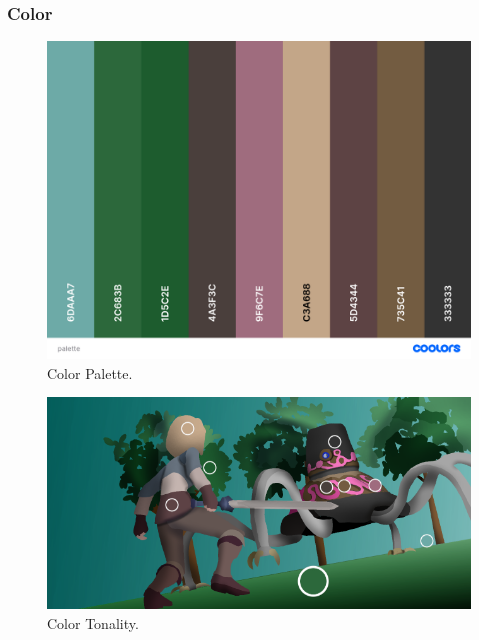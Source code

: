\documentclass{cup-pan}
\begin{document}
        \subsubsection{Color}

            \begin{figure}[H]
                \includegraphics[width=\textwidth]{Imagenes/Fanart2/Analysis/palette.png}
                \caption{Color Palette.}
            \end{figure}

            \begin{figure}[H]
                \includegraphics[width=\textwidth]{Imagenes/Fanart2/Analysis/tonalidad.png}
                \caption{Color Tonality.}
            \end{figure}
\end{document}
